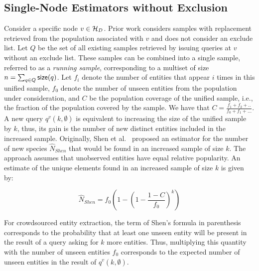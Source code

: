\subsection{Single-Node Estimators without Exclusion}
\label{sec:prevest}
Consider a specific node $v \in \mathcal{H}_D$. 
\iftr Prior work considers samples with replacement retrieved from the population associated with $v$ and does not consider an exclude list. 
\fi
Let $Q$ be the set of all existing samples retrieved by issuing queries at $v$ without an exclude list. 
These samples can be combined into a single sample, referred to as a {\em running sample}, corresponding to a multiset of size $n = \sum_{q \in Q} {\sf size}(q)$. Let $f_i$ denote the number of entities that appear $i$ times in this unified sample, $f_0$ denote the number of unseen entities from the population under consideration, and $C$ be the population coverage of the unified sample, i.e., the fraction of the population covered by the sample. We have that $C = \frac{f_1 + f_2 + ..}{f_0 + f_1 + ...}$.
A new query $q^v(k,\emptyset)$ is equivalent to increasing the size of the unified sample by $k$, thus, its gain is the number of new distinct entities included in the increased sample. Originally, Shen et al.~\cite{shen:2003} proposed an estimator for the number of new species $\hat{N}_{Shen}$ that would be found in an increased sample of size $k$. The approach assumes that unobserved entities have equal relative popularity. An estimate of the unique elements found in an increased sample of size $k$ is given by:

{\scriptsize \begin{equation}
\label{eq:shen}
\hat{N}_{Shen} = f_0\left( 1 - \left(1 - \frac{1 - C}{f_0}\right)^k\right)
\end{equation}}

For crowdsourced entity extraction, the term of Shen's formula in parenthesis corresponds to the probability that at least one unseen entity will be present in the result of a query asking for $k$ more entities. Thus, multiplying this quantity with the number of unseen entities $f_0$ corresponds to the expected number of unseen entities in the result of $q^v(k,\emptyset)$.

